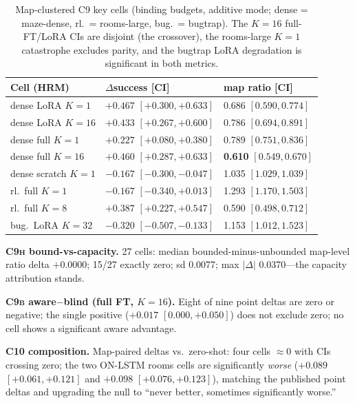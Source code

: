 \documentclass[letterpaper]{article} %
\newcommand{\stage}[1]{\textsc{#1}}
\begin{document}
\begin{table}[t]
\centering
\small
\setlength{\tabcolsep}{2.5pt}
\begin{tabular}{@{}lll@{}}
\toprule
Cell (HRM) & $\Delta$success [CI] & map ratio [CI] \\
\midrule
dense LoRA $K{=}1$ & $+0.467$ $[+0.300,+0.633]$ & 0.686 $[0.590,0.774]$ \\
dense LoRA $K{=}16$ & $+0.433$ $[+0.267,+0.600]$ & 0.786 $[0.694,0.891]$ \\
dense full $K{=}1$ & $+0.227$ $[+0.080,+0.380]$ & 0.789 $[0.751,0.836]$ \\
dense full $K{=}16$ & $+0.460$ $[+0.287,+0.633]$ & \textbf{0.610} $[0.549,0.670]$ \\
dense scratch $K{=}1$ & $-0.167$ $[-0.300,-0.047]$ & 1.035 $[1.029,1.039]$ \\
rl.\ full $K{=}1$ & $-0.167$ $[-0.340,+0.013]$ & 1.293 $[1.170,1.503]$ \\
rl.\ full $K{=}8$ & $+0.387$ $[+0.227,+0.547]$ & 0.590 $[0.498,0.712]$ \\
bug.\ LoRA $K{=}32$ & $-0.320$ $[-0.507,-0.133]$ & 1.153 $[1.012,1.523]$ \\
\bottomrule
\end{tabular}
\caption{Map-clustered \stage{C9} key cells (binding budgets, additive mode; dense = maze-dense, rl.\ = rooms-large, bug.\ = bugtrap). The $K{=}16$ full-FT/LoRA CIs are disjoint (the crossover), the rooms-large $K{=}1$ catastrophe excludes parity, and the bugtrap LoRA degradation is significant in both metrics.}
\label{tab:wcr-c9}
\end{table}

\textbf{\stage{C9h} bound-vs-capacity.} 27 cells: median bounded-minus-unbounded map-level ratio delta $+0.0000$; 15/27 exactly zero; sd 0.0077; max $|\Delta|$ 0.0370---the capacity attribution stands.

\textbf{\stage{C9b} aware$-$blind (full FT, $K{=}16$).} Eight of nine point deltas are zero or negative; the single positive ($+0.017$ $[0.000,+0.050]$) does not exclude zero; no cell shows a significant aware advantage.

\textbf{\stage{C10} composition.} Map-paired deltas vs.\ zero-shot: four cells $\approx$0 with CIs crossing zero; the two ON-LSTM rooms cells are significantly \emph{worse} ($+0.089$ $[+0.061,+0.121]$ and $+0.098$ $[+0.076,+0.123]$), matching the published point deltas and upgrading the null to ``never better, sometimes significantly worse.''
\end{document}
